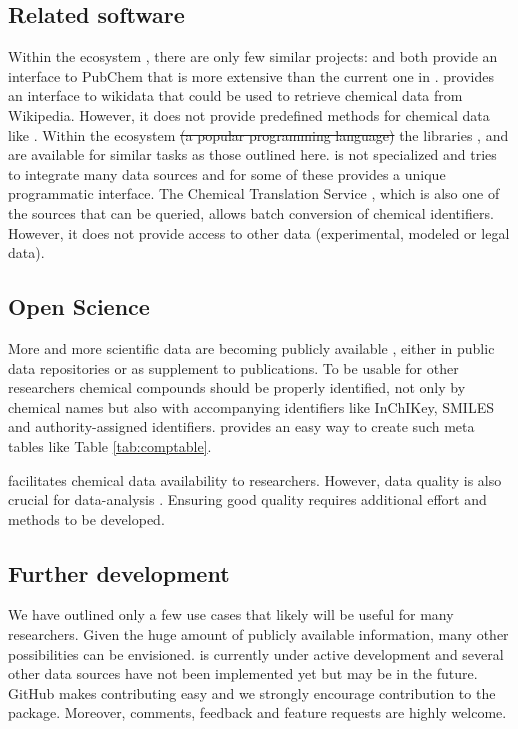 \documentclass[article, shortnames]{jss}\usepackage[]{graphicx}\usepackage[]{color}
\providecommand{\DIFdel}[1]{{\protect\color{red}\sout{#1}}}                      %
\providecommand{\DIFdelbegin}{} %
\providecommand{\DIFdelend}{} %
\begin{document}
\subsection[Related software]{Related software}
Within the  ecosystem , there are only few similar projects:
 \citep{rpubchem_2014} and  \citep{chemminer_2008} both provide an interface to PubChem that is more extensive than the current one in .
 \citep{wikidatar_2016} provides an interface to wikidata that could be used to retrieve chemical data from Wikipedia.
However, it does not provide predefined methods for chemical data like .
Within the  ecosystem \DIFdelbegin \DIFdel{(a popular programming language) }\DIFdelend the libraries  \citep{pubchempy},  \citep{chemspipy} and  \citep{cirpy} are available for similar tasks as those outlined here.
 is not specialized and tries to integrate many data sources and for some of these provides a unique programmatic interface.
The Chemical Translation Service \citep{Wohlgemuth_Haldiya_Willighagen_Kind_Fiehn_2010}, which is also one of the sources that can be queried,  allows batch conversion of chemical identifiers.
However, it does not provide access to other data (experimental, modeled or legal data).


\subsection[Open Science]{Open Science}
More and more scientific data are becoming publicly available \citep{Gewin_2016, Reichman_Jones_Schildhauer_2011,Boyle_Guha_2011}, either in public data repositories or as supplement to publications.
To be usable for other researchers chemical compounds should be properly identified, not only by chemical names but also with accompanying identifiers like InChIKey, SMILES and authority-assigned identifiers.
 provides an easy way to create such meta tables like Table \ref{tab:comptable}.

 facilitates chemical data availability to researchers.
However, data quality is also crucial for data-analysis \citep{Stieger_2014}. 
Ensuring good quality requires additional effort and methods to be developed.


\subsection[Further development]{Further development}
We have outlined only a few use cases that likely will be useful for many researchers.
Given the huge amount of publicly available information, many other possibilities can be envisioned.
 is currently under active development and several other data sources have not been implemented yet but may be in the future.
GitHub makes contributing easy and we strongly encourage contribution to the package.
Moreover, comments, feedback and feature requests are highly welcome.
\end{document}

